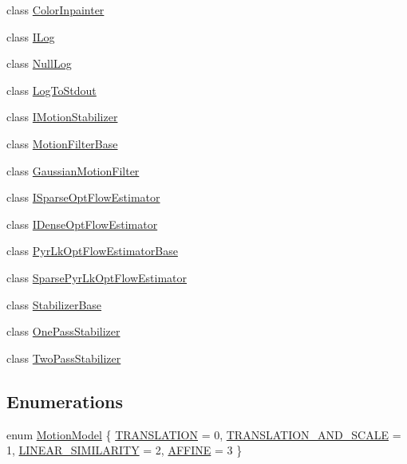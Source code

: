 \begin{DoxyCompactItemize}
\item 
class \hyperlink{classcv_1_1videostab_1_1ColorInpainter}{Color\-Inpainter}
\item 
class \hyperlink{classcv_1_1videostab_1_1ILog}{I\-Log}
\item 
class \hyperlink{classcv_1_1videostab_1_1NullLog}{Null\-Log}
\item 
class \hyperlink{classcv_1_1videostab_1_1LogToStdout}{Log\-To\-Stdout}
\item 
class \hyperlink{classcv_1_1videostab_1_1IMotionStabilizer}{I\-Motion\-Stabilizer}
\item 
class \hyperlink{classcv_1_1videostab_1_1MotionFilterBase}{Motion\-Filter\-Base}
\item 
class \hyperlink{classcv_1_1videostab_1_1GaussianMotionFilter}{Gaussian\-Motion\-Filter}
\item 
class \hyperlink{classcv_1_1videostab_1_1ISparseOptFlowEstimator}{I\-Sparse\-Opt\-Flow\-Estimator}
\item 
class \hyperlink{classcv_1_1videostab_1_1IDenseOptFlowEstimator}{I\-Dense\-Opt\-Flow\-Estimator}
\item 
class \hyperlink{classcv_1_1videostab_1_1PyrLkOptFlowEstimatorBase}{Pyr\-Lk\-Opt\-Flow\-Estimator\-Base}
\item 
class \hyperlink{classcv_1_1videostab_1_1SparsePyrLkOptFlowEstimator}{Sparse\-Pyr\-Lk\-Opt\-Flow\-Estimator}
\item 
class \hyperlink{classcv_1_1videostab_1_1StabilizerBase}{Stabilizer\-Base}
\item 
class \hyperlink{classcv_1_1videostab_1_1OnePassStabilizer}{One\-Pass\-Stabilizer}
\item 
class \hyperlink{classcv_1_1videostab_1_1TwoPassStabilizer}{Two\-Pass\-Stabilizer}
\end{DoxyCompactItemize}
\subsection*{Enumerations}
\begin{DoxyCompactItemize}
\item 
enum \hyperlink{namespacecv_1_1videostab_ac61e59db30b7d13983885d3ad3116ce1}{Motion\-Model} \{ \hyperlink{namespacecv_1_1videostab_ac61e59db30b7d13983885d3ad3116ce1ace445d5731bccc8cdacc3f9754b59674}{T\-R\-A\-N\-S\-L\-A\-T\-I\-O\-N} = 0, 
\hyperlink{namespacecv_1_1videostab_ac61e59db30b7d13983885d3ad3116ce1af7781d34aae679f580207b41625cd178}{T\-R\-A\-N\-S\-L\-A\-T\-I\-O\-N\-\_\-\-A\-N\-D\-\_\-\-S\-C\-A\-L\-E} = 1, 
\hyperlink{namespacecv_1_1videostab_ac61e59db30b7d13983885d3ad3116ce1ae443ad61ca4230833d8d649d34bfb318}{L\-I\-N\-E\-A\-R\-\_\-\-S\-I\-M\-I\-L\-A\-R\-I\-T\-Y} = 2, 
\hyperlink{namespacecv_1_1videostab_ac61e59db30b7d13983885d3ad3116ce1a3b3ab5020ce40832da2080ca63f4a3fc}{A\-F\-F\-I\-N\-E} = 3
 \}
\end{DoxyCompactItemize}
